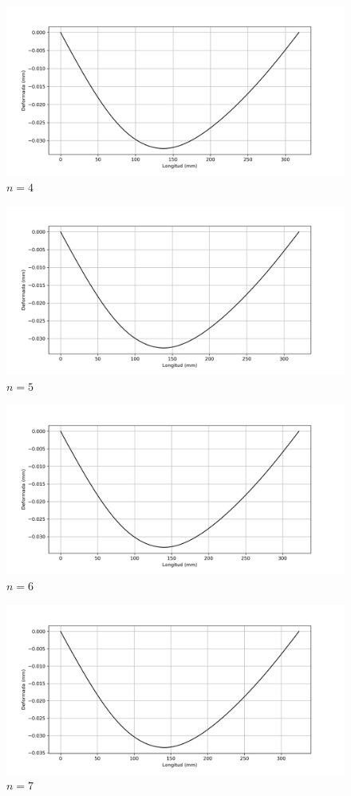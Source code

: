 \documentclass[a4paper,11pt]{report}
\begin{document}
\begin{figure}[H]
\centering
\includegraphics[scale=0.68]{defj4.png}
\caption{$n = 4$}
\end{figure}
\begin{figure}[H]
\centering
\includegraphics[scale=0.68]{defj5.png}
\caption{$n = 5$}
\end{figure}
\begin{figure}[H]
\centering
\includegraphics[scale=0.68]{defj6.png}
\caption{$n = 6$}
\end{figure}
\begin{figure}[H]
\centering
\includegraphics[scale=0.68]{defj7.png}
\caption{$n = 7$}
\end{figure}
\end{document}
